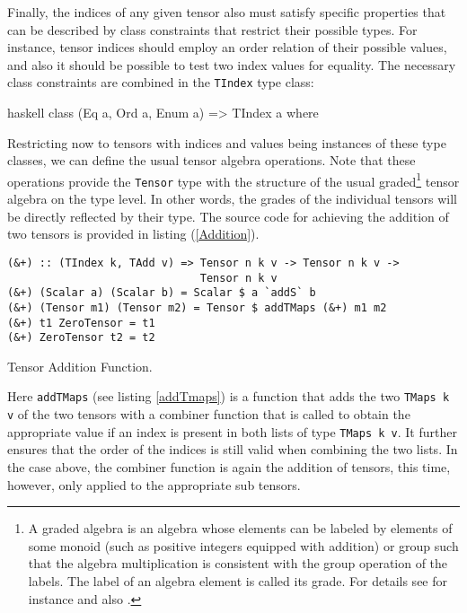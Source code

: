 Finally, the indices of any given tensor also must satisfy specific properties that can be described by class constraints that restrict their possible types. For instance, tensor indices should employ an order relation of their possible values, and also it should be possible to test two index values for equality. The necessary class constraints are combined in the \texttt{TIndex} type class:
\begin{center}
\begin{cminted}{haskell}
class (Eq a, Ord a, Enum a) => TIndex a where
\end{cminted} 
\end{center}



Restricting now to tensors with indices and values being instances of these type classes, we can define the usual tensor algebra operations.
Note that these operations provide the \texttt{Tensor} type with the structure of the usual graded\footnote{A graded algebra is an algebra whose elements can be labeled by elements of some monoid (such as positive integers equipped with addition) or group such that the algebra multiplication is consistent with the group operation of the labels. The label of an algebra element is called its grade.
For details see for instance \cite{bourbaki1998algebra} and also \cite{nlab:gradedAlg}.} tensor algebra on the type level. In other words, the grades of the individual tensors will be directly reflected by their type.
The source code for achieving the addition of two tensors is provided in listing (\ref{Addition}).
\begin{listing}[hbt!]
\begin{verbatim}
(&+) :: (TIndex k, TAdd v) => Tensor n k v -> Tensor n k v ->
                              Tensor n k v
(&+) (Scalar a) (Scalar b) = Scalar $ a `addS` b
(&+) (Tensor m1) (Tensor m2) = Tensor $ addTMaps (&+) m1 m2
(&+) t1 ZeroTensor = t1
(&+) ZeroTensor t2 = t2
\end{verbatim} 
\caption{Tensor Addition Function.}\label{Addition}
\end{listing}
Here \texttt{addTMaps} (see listing \ref{addTmaps}) is a function that adds the two \texttt{TMaps k v} of the two tensors with a combiner function that is called to obtain the appropriate value if an index is present in both lists of type \texttt{TMaps k v}. It further ensures that the order of the indices is still valid when combining the two lists. In the case above, the combiner function is again the addition of tensors, this time, however, only applied to the appropriate sub tensors. 

